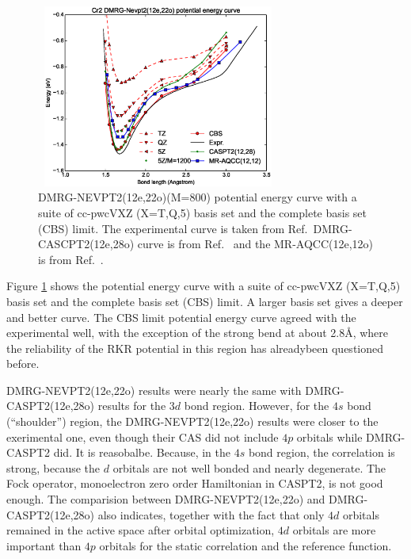 \begin{figure}\label{fig:5qt_fitting}
  \includegraphics[width=8cm,height=6cm]{application/5qt-fitting.eps}
  \caption{DMRG-NEVPT2(12e,22o)(M=800) potential energy curve with a suite of cc-pwcVXZ (X=T,Q,5) basis set and the complete basis set (CBS) limit. The experimental curve is taken from Ref.~DMRG-CASCPT2(12e,28o) curve is from Ref.~ and the MR-AQCC(12e,12o) is from Ref.~.}
\end{figure}

Figure \ref{fig:5qt_fitting} shows the potential energy curve with a suite of cc-pwcVXZ (X=T,Q,5) basis set and the complete basis set (CBS) limit. A larger basis set gives a deeper and better curve. The CBS limit potential energy curve agreed with the experimental well, with the exception of the strong bend at about 2.8\AA, where the reliability of the RKR potential in this region has alreadybeen questioned before.\cite{roos_ground_2003}

DMRG-NEVPT2(12e,22o) results were nearly the same with DMRG-CASPT2(12e,28o)\cite{kurashige_second-order_2011} results for the $3d$ bond region. However, for the $4s$ bond (``shoulder'') region, the DMRG-NEVPT2(12e,22o) results were closer to the exerimental one, even though their CAS did not include $4p$ orbitals while DMRG-CASPT2 did. 
It is reasobalbe. Because, in the $4s$ bond region, the correlation is strong, because the $d$ orbitals are not well bonded and nearly degenerate. The Fock operator, monoelectron zero order Hamiltonian in CASPT2, is not good enough. 
The comparision between DMRG-NEVPT2(12e,22o) and DMRG-CASPT2(12e,28o) also indicates, together with the fact that only $4d$ orbitals remained in the active space after orbital optimization, $4d$ orbitals are more important than $4p$ orbitals for the static correlation and the reference function.

